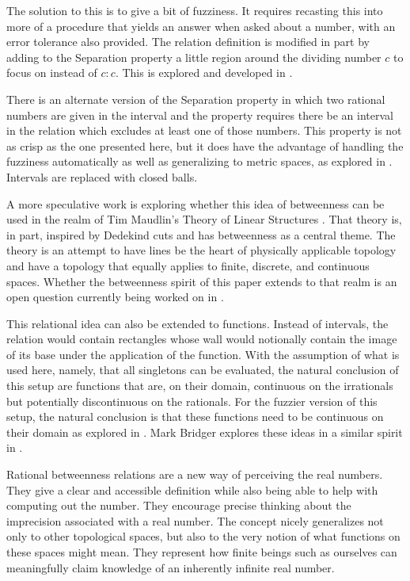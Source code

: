 \documentclass{rmj-public}
\begin{document}
The solution to this is to give a bit of fuzziness. It requires recasting this into more of a procedure that yields an answer when asked about a number, with an error tolerance also provided. The relation definition is modified in part by adding to the Separation property a little region around the dividing number $c$ to focus on instead of $c:c$. This is explored and developed in \cite{taylor23main}.

There is an alternate version of the Separation property in which two rational numbers are given in the interval and the property requires there be an interval in the relation which excludes at least one of those numbers. This property is not as crisp as the one presented here, but it does have the advantage of handling the fuzziness automatically as well as generalizing to metric spaces, as explored in \cite{taylor23metric}. Intervals are replaced with closed balls. 

A more speculative work is exploring whether this idea of betweenness can be used in the realm of Tim Maudlin's Theory of Linear Structures \cite{maudlin}. That theory is, in part, inspired by Dedekind cuts and has betweenness as a central theme. The theory is an attempt to have lines be the heart of physically applicable topology and have a topology that equally applies to finite, discrete, and continuous spaces. Whether the betweenness spirit of this paper extends to that realm is an open question currently being worked on in \cite{taylor23maudlin}.

This relational idea can also be extended to functions. Instead of intervals, the relation would contain rectangles whose wall would notionally contain the image of its base under the application of the function. With the assumption of what is used here, namely, that all singletons can be evaluated, the natural conclusion of this setup are functions that are, on their domain, continuous on the irrationals but potentially discontinuous on the rationals. For the fuzzier version of this setup, the natural conclusion is that these functions need to be continuous on their domain as explored in \cite{taylor23main}. Mark Bridger explores  these ideas in a similar spirit in \cite{bridger}.

Rational betweenness relations are a new way of perceiving the real numbers. They give a clear and accessible definition while also being able to help with computing out the number. They encourage precise thinking about the imprecision associated with a real number. The concept nicely generalizes not only to other topological spaces, but also to the very notion of what functions on these spaces might mean. They represent how finite beings such as ourselves can meaningfully claim knowledge of an inherently infinite real number. 


\medskip

\normalem %
\printbibliography
\end{document}
